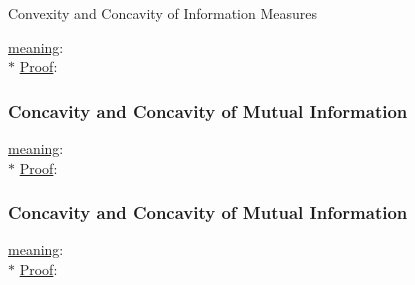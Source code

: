 \documentclass[9pt]{beamer}
\begin{document}
\begin{section}{Convexity and Concavity of Information Measures}
\begin{frame}
\begin{corollary}
            \end{corollary}
            \checkmark \underline{meaning}:
            \\ $\ast$ \underline{Proof}: 
        \end{frame}

        \begin{frame}
            \frametitle{Concavity and Concavity of Mutual Information}
            \begin{corollary}
                
            \end{corollary}
            \checkmark \underline{meaning}:
            \\ $\ast$ \underline{Proof}: 
        \end{frame}

        \begin{frame}
            \frametitle{Concavity and Concavity of Mutual Information}
            \begin{corollary}
                
            \end{corollary}
            \checkmark \underline{meaning}:
            \\ $\ast$ \underline{Proof}: 
        \end{frame}

    \end{section}
\end{document}
